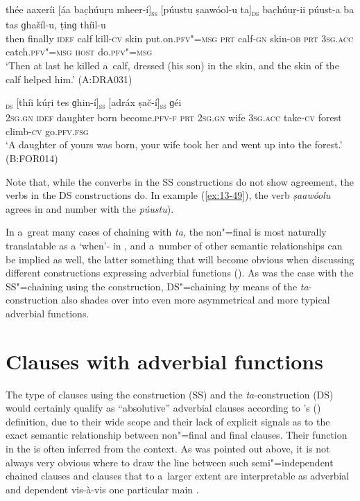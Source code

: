 \begin{exe}
\ex
\label{ex:13-49}
\gll thée aaxeríi [áa bac̣húuṛu mheer-í]\textsc{\textsubscript{ss}} [púustu ṣaawóol-u ta]\textsc{\textsubscript{ds}} bac̣húuṛ-ii púust-a ba tas ɡhašíl-u, ṭinɡ thíil-u \\
then finally \textsc{idef} calf kill-\textsc{cv}  skin  put.on.\textsc{pfv"=msg} \textsc{prt} calf-\textsc{gn} skin-\textsc{ob} \textsc{prt} \textsc{3sg.acc}
catch.\textsc{pfv"=msg} \textsc{host} do.\textsc{pfv"=msg} \\
\glt `Then at last he killed a~calf, dressed (his son) in the skin, and the skin of the calf helped him.' (A:DRA031)

\ex
\label{ex:13-50}
\textsc{\textsubscript{ds}} [thíi kúṛi tes ɡhin-í]\textsc{\textsubscript{ss}} [adráx ṣač-í]\textsc{\textsubscript{ss}} ɡéi \\
\textsc{2sg.gn} \textsc{idef} daughter born become.\textsc{pfv-f} \textsc{prt} \textsc{2sg.gn}  wife \textsc{3sg.acc} take-\textsc{cv} forest climb-\textsc{cv} go.\textsc{pfv.fsg} \\
\glt `A daughter of yours was born, your wife took her and went up into the forest.' (B:FOR014) 
\end{exe}

Note that, while the converbs in the SS constructions do not show agreement, the verbs in the DS constructions do. In example (\ref{ex:13-49}), the  verb \textit{ṣaawóolu} agrees in  and number with the  \textit{púustu}). 


In a~great many cases of chaining with \textit{ta,} the non"=final  is most naturally translatable as a `when'- in , and a~number of other semantic relationships can be implied as well, the latter something that will become obvious when discussing different constructions expressing adverbial functions (). As was the case with the SS"=chaining using the  construction, DS"=chaining by means of the \textit{ta}-construction also shades over into even more asymmetrical and more typical adverbial functions. 


\section{Clauses with adverbial functions}
\label{sec:13-4}

The type of clauses using the  construction (SS) and the \textit{ta}-construction (DS) would certainly qualify as ``absolutive'' adverbial clauses according to \citeauthor{thompsonetal2007}'s (\citeyear[264--266]{thompsonetal2007}) definition, due to their wide scope and their lack of explicit signals as to the exact semantic relationship between non"=final and final clauses. Their function in the  is often inferred from the context. As was pointed out above, it is not always very obvious where to draw the line between such semi"=independent chained clauses and clauses that to a~larger extent are interpretable as adverbial and dependent vis-à-vis one particular main . 



